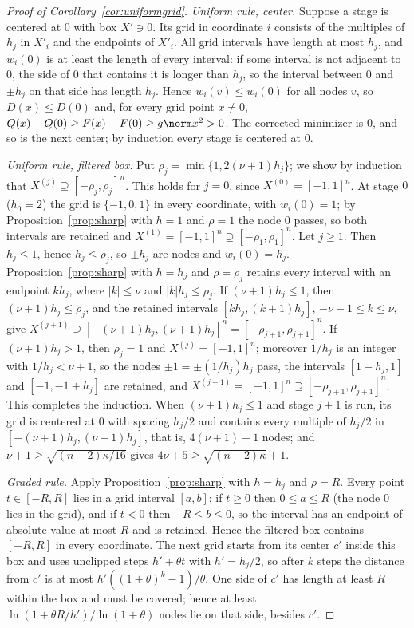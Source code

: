 \begin{proof}[Proof of Corollary~\ref{cor:uniformgrid}]
\emph{Uniform rule, center.} Suppose a stage is centered at $0$ with box
$X'\ni0$. Its grid in coordinate $i$ consists of the multiples of $h_j$ in
$X'_i$ and the endpoints of $X'_i$. All grid intervals have length at most
$h_j$, and $w_i(0)$ is at least the length of every interval: if some
interval is not adjacent to $0$, the side of $0$ that contains it is longer
than $h_j$, so the interval between $0$ and $\pm h_j$ on that side has length
$h_j$. Hence $w_i(v)\le w_i(0)$ for all nodes $v$, so $D(x)\le D(0)$ and, for
every grid point $x\ne0$, $Q(x)-Q(0)\ge F(x)-F(0)\ge g\norm x^2>0$. The
corrected minimizer is $0$, and so is the next center; by induction every
stage is centered at $0$.

\emph{Uniform rule, filtered box.} Put $\rho_j=\min\{1,2(\nu+1)h_j\}$; we show
by induction that $X^{(j)}\supseteq[-\rho_j,\rho_j]^n$. This holds for $j=0$,
since $X^{(0)}=[-1,1]^n$. At stage $0$ ($h_0=2$) the grid is $\{-1,0,1\}$ in
every coordinate, with $w_i(0)=1$; by Proposition~\ref{prop:sharp} with $h=1$
and $\rho=1$ the node $0$ passes, so both intervals are retained and
$X^{(1)}=[-1,1]^n\supseteq[-\rho_1,\rho_1]^n$. Let $j\ge1$. Then $h_j\le1$,
hence $h_j\le\rho_j$, so $\pm h_j$ are nodes and $w_i(0)=h_j$.
Proposition~\ref{prop:sharp} with $h=h_j$ and $\rho=\rho_j$ retains every
interval with an endpoint $kh_j$, where $|k|\le\nu$ and $|k|h_j\le\rho_j$. If
$(\nu+1)h_j\le1$, then $(\nu+1)h_j\le\rho_j$, and the retained intervals
$[kh_j,(k+1)h_j]$, $-\nu-1\le k\le\nu$, give
$X^{(j+1)}\supseteq[-(\nu+1)h_j,(\nu+1)h_j]^n=[-\rho_{j+1},\rho_{j+1}]^n$. If
$(\nu+1)h_j>1$, then $\rho_j=1$ and $X^{(j)}=[-1,1]^n$; moreover $1/h_j$ is an
integer with $1/h_j<\nu+1$, so the nodes $\pm1=\pm(1/h_j)h_j$ pass, the
intervals $[1-h_j,1]$ and $[-1,-1+h_j]$ are retained, and
$X^{(j+1)}=[-1,1]^n\supseteq[-\rho_{j+1},\rho_{j+1}]^n$. This completes the
induction. When $(\nu+1)h_j\le1$ and stage $j+1$ is run, its grid is
centered at $0$ with spacing $h_j/2$ and contains every multiple of $h_j/2$ in
$[-(\nu+1)h_j,(\nu+1)h_j]$, that is, $4(\nu+1)+1$ nodes; and
$\nu+1\ge\sqrt{(n-2)\kappa/16}$ gives $4\nu+5\ge\sqrt{(n-2)\kappa}+1$.

\emph{Graded rule.} Apply Proposition~\ref{prop:sharp} with $h=h_j$ and
$\rho=R$. Every point $t\in[-R,R]$ lies in a grid interval $[a,b]$; if
$t\ge0$ then $0\le a\le R$ (the node $0$ lies in the grid), and if $t<0$ then
$-R\le b\le0$, so the interval has an endpoint of absolute value at most
$R$ and is retained. Hence the filtered box contains $[-R,R]$ in every
coordinate. The next grid starts from its center $c'$ inside this box and
uses unclipped steps $h'+\theta t$ with $h'=h_j/2$, so after $k$ steps the
distance from $c'$ is at most $h'((1+\theta)^k-1)/\theta$. One side of $c'$
has length at least $R$ within the box and must be covered; hence at least
$\ln(1+\theta R/h')/\ln(1+\theta)$ nodes lie on that side, besides $c'$.
\end{proof}

